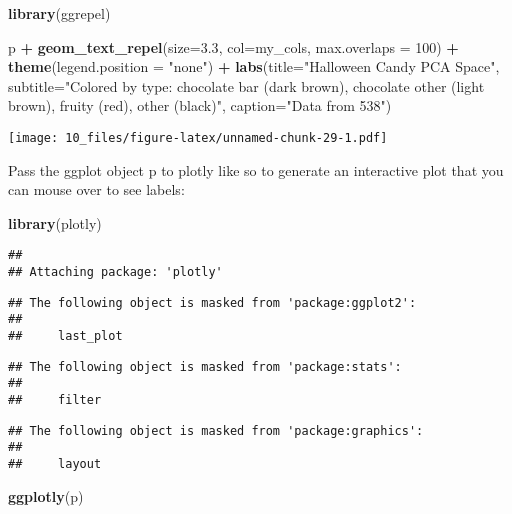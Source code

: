 \documentclass[
]{article}
\newenvironment{Shaded}{\begin{snugshade}}{\end{snugshade}}
\newcommand{\AttributeTok}[1]{\textcolor[rgb]{0.13,0.29,0.53}{#1}}
\newcommand{\DecValTok}[1]{\textcolor[rgb]{0.00,0.00,0.81}{#1}}
\newcommand{\FloatTok}[1]{\textcolor[rgb]{0.00,0.00,0.81}{#1}}
\newcommand{\FunctionTok}[1]{\textcolor[rgb]{0.13,0.29,0.53}{\textbf{#1}}}
\newcommand{\NormalTok}[1]{#1}
\newcommand{\SpecialCharTok}[1]{\textcolor[rgb]{0.81,0.36,0.00}{\textbf{#1}}}
\newcommand{\StringTok}[1]{\textcolor[rgb]{0.31,0.60,0.02}{#1}}
\begin{document}
\begin{Shaded}
\begin{Highlighting}[]
\FunctionTok{library}\NormalTok{(ggrepel)}

\NormalTok{p }\SpecialCharTok{+} \FunctionTok{geom\_text\_repel}\NormalTok{(}\AttributeTok{size=}\FloatTok{3.3}\NormalTok{, }\AttributeTok{col=}\NormalTok{my\_cols, }\AttributeTok{max.overlaps =} \DecValTok{100}\NormalTok{)  }\SpecialCharTok{+} 
  \FunctionTok{theme}\NormalTok{(}\AttributeTok{legend.position =} \StringTok{"none"}\NormalTok{) }\SpecialCharTok{+}
  \FunctionTok{labs}\NormalTok{(}\AttributeTok{title=}\StringTok{"Halloween Candy PCA Space"}\NormalTok{,}
       \AttributeTok{subtitle=}\StringTok{"Colored by type: chocolate bar (dark brown), chocolate other (light brown), fruity (red), other (black)"}\NormalTok{,}
       \AttributeTok{caption=}\StringTok{"Data from 538"}\NormalTok{)}
\end{Highlighting}
\end{Shaded}

\texttt{[image: 10\_files/figure-latex/unnamed-chunk-29-1.pdf]}

Pass the ggplot object p to plotly like so to generate an interactive
plot that you can mouse over to see labels:

\begin{Shaded}
\begin{Highlighting}[]
\FunctionTok{library}\NormalTok{(plotly)}
\end{Highlighting}
\end{Shaded}

\begin{verbatim}
## 
## Attaching package: 'plotly'
\end{verbatim}

\begin{verbatim}
## The following object is masked from 'package:ggplot2':
## 
##     last_plot
\end{verbatim}

\begin{verbatim}
## The following object is masked from 'package:stats':
## 
##     filter
\end{verbatim}

\begin{verbatim}
## The following object is masked from 'package:graphics':
## 
##     layout
\end{verbatim}

\begin{Shaded}
\begin{Highlighting}[]
\FunctionTok{ggplotly}\NormalTok{(p)}
\end{Highlighting}
\end{Shaded}
\end{document}
